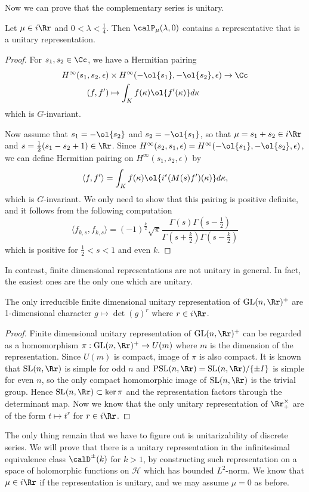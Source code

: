 Now we can prove that the complementary series is unitary. 
\begin{theorem}
Let $\mu\in i\Rr$ and $0<\lambda < \frac{1}{4}$. Then $\calP_{\mu}(\lambda, 0)$ contains a representative that is a unitary representation. 
\end{theorem}
\begin{proof}
For $s_{1}, s_{2}\in \Cc$, we have a Hermitian pairing 
\begin{align*}
H^{\infty}(s_{1}, s_{2}, \epsilon) &\times H^{\infty}(-\ol{s_{1}}, -\ol{s_{2}}, \epsilon) \to \Cc \\
(f, f')&\mapsto \int_{K} f(\kappa) \ol{f'(\kappa)} d\kappa
\end{align*}
which is $G$-invariant. 

Now assume that $s_{1} = -\ol{s_{2}}$ and $s_{2} = -\ol{s_{1}}$, so that $\mu = s_{1} + s_{2} \in i\Rr$ and $s = \frac{1}{2}(s_{1} - s_{2} + 1)\in \Rr$. Since $H^{\infty}(s_{2}, s_{1}, \epsilon) = H^{\infty} (-\ol{s_{1}}, -\ol{s_{2}}, \epsilon)$, we can define Hermitian pairing on $H^{\infty}(s_{1}, s_{2}, \epsilon)$ by 
$$
\langle f, f'\rangle = \int_{K} f(\kappa)\ol{i^{\epsilon}(M(s)f')(\kappa)}d\kappa, 
$$
which is $G$-invariant. We only need to show that this pairing is positive definite, and it follows from the following computation
$$
\langle f_{k, s}, f_{k, s}\rangle = (-1)^{\frac{k}{2}} \sqrt{\pi} \frac{\Gamma(s)\Gamma\left(s-\frac{1}{2}\right)}{\Gamma\left(s+\frac{k}{2}\right)\Gamma\left(s-\frac{k}{2}\right)}
$$
which is positive for $\frac{1}{2} <s < 1$ and even $k$. 
\end{proof}

In contrast, finite dimensional representations are not unitary in general. In fact, the easiest ones are the only one which are unitary. 
\begin{proposition}
The only irreducible finite dimensional unitary representation of $\GL(n, \Rr)^{+}$ are 1-dimensional character $g\mapsto \det(g)^{r}$ where $r\in i\Rr$. 
\end{proposition}
\begin{proof}
Finite dimensional unitary representation of $\GL(n, \Rr)^{+}$ can be regarded as a homomorphism $\pi:\GL(n, \Rr)^{+}\to U(m)$ where $m$ is the dimension of the representation. Since $U(m)$ is compact, image of $\pi$ is also compact. It is known that $\SL(n, \Rr)$  is simple for odd $n$ and $\mathrm{PSL}(n, \Rr) = \SL(n, \Rr)/\{\pm I\}$ is simple for even $n$, so the only compact homomorphic image of $\SL(n, \Rr)$ is the trivial group. 
Hence $\SL(n, \Rr)\subset \ker\pi$ and the representation factors through the determinant map. Now we know that the only unitary representation of $\Rr_{+}^{\times}$ are of the form $t\mapsto t^{r}$ for $r\in i\Rr$. 
\end{proof}
The only thing remain that we have to figure out is unitarizability of discrete series. We will prove that there is a unitary representation in the infinitesimal equivalence class $\calD^{\pm}(k)$ for $k>1$, by constructing such representation on a space of holomorphic functions on $\mathcal{H}$ which has bounded $L^{2}$-norm. 
We know that $\mu\in i\Rr$ if the representation is unitary, and we may assume $\mu = 0$ as before. 

